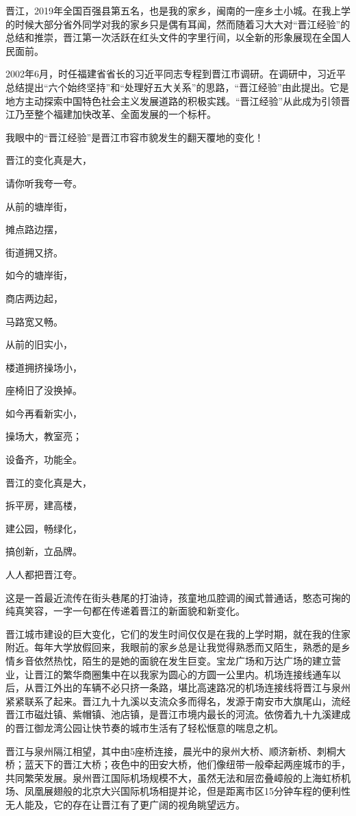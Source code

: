 \documentclass[
]{book}
\begin{document}
晋江，2019年全国百强县第五名，也是我的家乡，闽南的一座乡土小城。在我上学的时候大部分省外同学对我的家乡只是偶有耳闻，然而随着习大大对``晋江经验''的总结和推崇，晋江第一次活跃在红头文件的字里行间，以全新的形象展现在全国人民面前。

2002年6月，时任福建省省长的习近平同志专程到晋江市调研。在调研中，习近平总结提出``六个始终坚持''和``处理好五大关系''的思路，``晋江经验''由此提出。它是地方主动探索中国特色社会主义发展道路的积极实践。``晋江经验''从此成为引领晋江乃至整个福建加快改革、全面发展的一个标杆。

我眼中的``晋江经验''是晋江市容市貌发生的翻天覆地的变化！

晋江的变化真是大，

请你听我夸一夸。

从前的塘岸街，

摊点路边摆，

街道拥又挤。

如今的塘岸街，

商店两边起，

马路宽又畅。

从前的旧实小，

楼道拥挤操场小，

座椅旧了没换掉。

如今再看新实小，

操场大，教室亮；

设备齐，功能全。

晋江的变化真是大，

拆平房，建高楼，

建公园，畅绿化，

搞创新，立品牌。

人人都把晋江夸。

这是一首最近流传在街头巷尾的打油诗，孩童地瓜腔调的闽式普通话，憨态可掬的纯真笑容，一字一句都在传递着晋江的新面貌和新变化。

晋江城市建设的巨大变化，它们的发生时间仅仅是在我的上学时期，就在我的住家附近。每年大学放假回来，我眼前的家乡总是让我觉得熟悉而又陌生，熟悉的是乡情乡音依然热忱，陌生的是她的面貌在发生巨变。宝龙广场和万达广场的建立营业，让晋江的繁华商圈集中在以我家为圆心的方圆一公里内。机场连接线通车以后，从晋江外出的车辆不必只挤一条路，堪比高速路况的机场连接线将晋江与泉州紧紧联系了起来。晋江九十九溪以支流众多而得名，发源于南安市大旗尾山，流经晋江市磁灶镇、紫帽镇、池店镇，是晋江市境内最长的河流。依傍着九十九溪建成的晋江御龙湾公园让快节奏的城市生活有了轻松惬意的喘息之机。

晋江与泉州隔江相望，其中由5座桥连接，晨光中的泉州大桥、顺济新桥、刺桐大桥；蓝天下的晋江大桥；夜色中的田安大桥，他们像纽带一般牵起两座城市的手，共同繁荣发展。泉州晋江国际机场规模不大，虽然无法和层峦叠嶂般的上海虹桥机场、凤凰展翅般的北京大兴国际机场相提并论，但是距离市区15分钟车程的便利性无人能及，它的存在让晋江有了更广阔的视角眺望远方。
\end{document}
